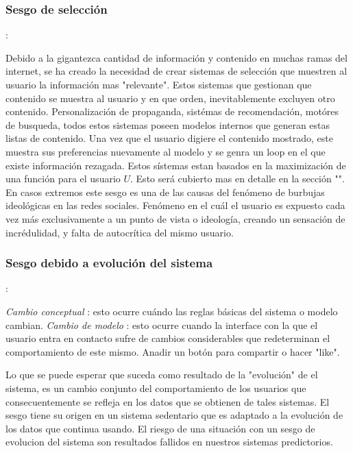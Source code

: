 \subsubsection{Sesgo de selección}:

Debido a la gigantezca cantidad de información y contenido en muchas ramas del internet, se ha creado la necesidad de crear sistemas de selección que muestren al usuario la información mas "relevante".
Estos sistemas que gestionan que contenido se muestra al usuario y en que orden, inevitablemente excluyen otro contenido. Personalización de propaganda, sistémas de recomendación, motóres de busqueda, todos estos sistemas poseen modelos internos que generan estas listas de contenido. Una vez que el usuario digiere el contenido mostrado, este muestra sus preferencias nuevamente al modelo y se genra un loop en el que existe información rezagada. Estos sístemas estan basados en la maximización de una función para el usuario $U$. Esto será cubierto mas en detalle en la sección "".\\
En casos extremos este sesgo es una de las causas del fenómeno de burbujas ideológicas en las redes sociales. Fenómeno en el cuál el usuario es expuesto cada vez más exclusivamente a un punto de vista o ideología, creando un sensación de incrédulidad, y falta de autocrítica del mismo usuario.


\subsubsection{Sesgo debido a evolución del sistema}:

\textsl{Cambio conceptual} : esto ocurre cuándo las reglas básicas del sistema o modelo cambian.
\textsl{Cambio de modelo} : esto ocurre cuando la interface con la que el usuario entra en contacto sufre de cambios considerables que redeterminan el comportamiento de este mismo. Anadir un botón para compartir o hacer "like".

Lo que se puede esperar que suceda como resultado de la "evolución" de el sistema, es un cambio conjunto del comportamiento de los usuarios que consecuentemente se refleja en los datos que se obtienen de tales sistemas. El sesgo tiene su origen en un sistema sedentario que es adaptado a la evolución de los datos que continua usando. El riesgo de una situación con un sesgo de evolucion del sistema son resultados fallidos en nuestros sistemas predictorios.

